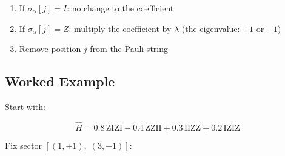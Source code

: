 \documentclass[
  11pt,
  oneside]{book}
\providecommand{\tightlist}{%
  \setlength{\itemsep}{0pt}\setlength{\parskip}{0pt}}
\begin{document}
\begin{enumerate}
\def\labelenumi{\arabic{enumi}.}
\tightlist
\item
  If \(\sigma_\alpha[j] = I\): no change to the coefficient
\item
  If \(\sigma_\alpha[j] = Z\): multiply the coefficient by \(\lambda\)
  (the eigenvalue: \(+1\) or \(-1\))
\item
  Remove position \(j\) from the Pauli string
\end{enumerate}

\subsection{Worked Example}\label{worked-example-1}

Start with:

\[\hat{H} = 0.8\,\text{ZIZI} - 0.4\,\text{ZZII} + 0.3\,\text{IIZZ} + 0.2\,\text{IZIZ}\]

Fix sector \([(1, +1),\; (3, -1)]\):
\end{document}
